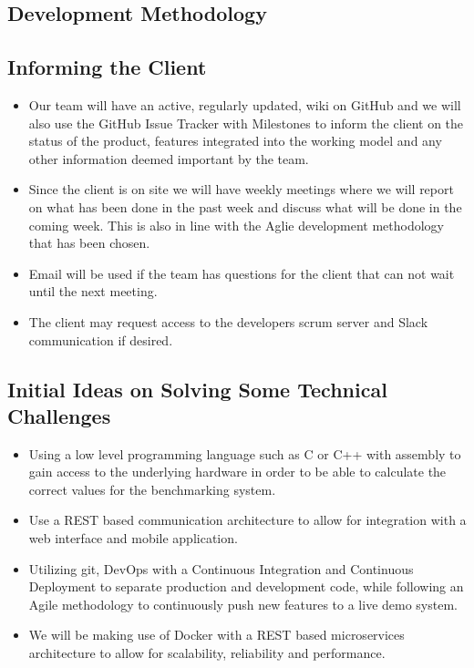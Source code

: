 \subsection{Development Methodology}


\subsection{Informing the Client}
\begin{itemize}
	\item Our team will have an active, regularly updated, wiki on GitHub and we will also use the GitHub Issue Tracker with Milestones to inform the client on the status of the product, features integrated into the working model and any other information deemed important by the team.
	\item Since the client is on site we will have weekly meetings where we will report on what has been done in the past week and discuss what will be done in the coming week. This is also in line with the Aglie development methodology that has been chosen.
	\item Email will be used if the team has questions for the client that can not wait until the next meeting.
	\item The client may request access to the developers scrum server and Slack communication if desired.
\end{itemize}

\subsection{Initial Ideas on Solving Some Technical Challenges}
\begin{itemize}
	\item Using a low level programming language such as C or C++ with assembly to gain access to the underlying hardware in order to be able to calculate the correct values for the benchmarking system.
	\item Use a REST based communication architecture to allow for integration with a web interface and mobile application.
	\item Utilizing git, DevOps with a Continuous Integration and Continuous Deployment to separate production and development code, while following an Agile methodology to continuously push new features to a live demo system.
	\item We will be making use of Docker with a REST based microservices architecture to allow for scalability, reliability and performance.
\end{itemize}

